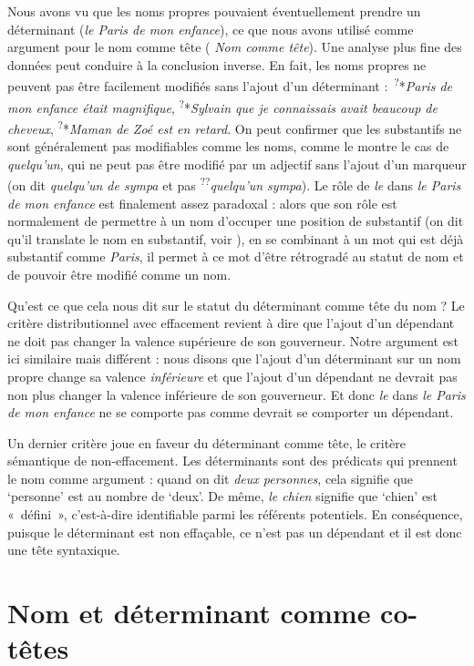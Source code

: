 Nous avons vu que les noms propres pouvaient éventuellement prendre un déterminant (\textit{le Paris de mon enfance}), ce que nous avons utilisé comme argument pour le nom comme tête ( \textit{Nom comme tête}). Une analyse plus fine des données peut conduire à la conclusion inverse. En fait, les noms propres ne peuvent pas être facilement modifiés sans l’ajout d’un déterminant :~\textsuperscript{?}*\textit{Paris de mon enfance était magnifique}, \textsuperscript{?}*\textit{Sylvain que je connaissais avait beaucoup de cheveux}, \textsuperscript{?}*\textit{Maman de Zoé est en retard}. On peut confirmer que les substantifs ne sont généralement pas modifiables comme les noms, comme le montre le cas de \textit{quelqu’un}, qui ne peut pas être modifié par un adjectif sans l’ajout d’un marqueur (on dit \textit{quelqu’un de sympa} et pas \textsuperscript{??}\textit{quelqu’un sympa}). Le rôle de \textit{le} dans \textit{le Paris de mon enfance} est finalement assez paradoxal : alors que son rôle est normalement de permettre à un nom d’occuper une position de substantif (on dit qu’il translate le nom en substantif, voir ), en se combinant à un mot qui est déjà substantif comme \textit{Paris}, il permet à ce mot d’être rétrogradé au statut de nom et de pouvoir être modifié comme un nom.

Qu’est ce que cela nous dit sur le statut du déterminant comme tête du nom ? Le critère distributionnel avec effacement revient à dire que l’ajout d’un dépendant ne doit pas changer la valence supérieure de son gouverneur. Notre argument est ici similaire mais différent : nous disons que l’ajout d’un déterminant sur un nom propre change sa valence \textit{inférieure} et que l’ajout d’un dépendant ne devrait pas non plus changer la valence inférieure de son gouverneur. Et donc \textit{le} dans \textit{le Paris de mon enfance} ne se comporte pas comme devrait se comporter un dépendant.

Un dernier critère joue en faveur du déterminant comme tête, le critère sémantique de non-effacement. Les déterminants sont des prédicats qui prennent le nom comme argument : quand on dit \textit{deux personnes}, cela signifie que ‘personne’ est au nombre de ‘deux’. De même, \textit{le chien} signifie que ‘chien’ est «~défini~», c’est-à-dire identifiable parmi les référents potentiels. En conséquence, puisque le déterminant est non effaçable, ce n’est pas un dépendant et il est donc une tête syntaxique.

\section{Nom et déterminant comme co-têtes}\label{sec:3.3.27}

